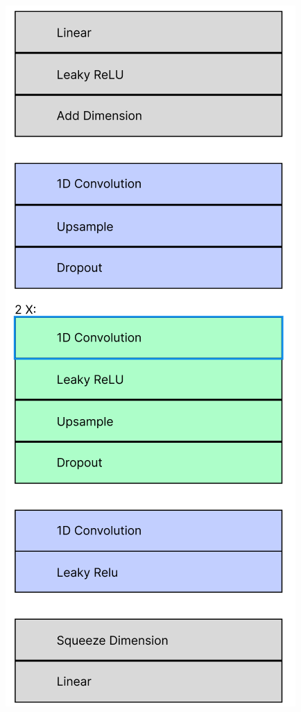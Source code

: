 \documentclass{article}
\begin{document}
\begin{multicols}{2}
\begin{center}
        \includegraphics[scale=0.3]{imgs/stefan/generator-graphic-v1.png}
    \end{center}


\end{multicols}
\end{document}
